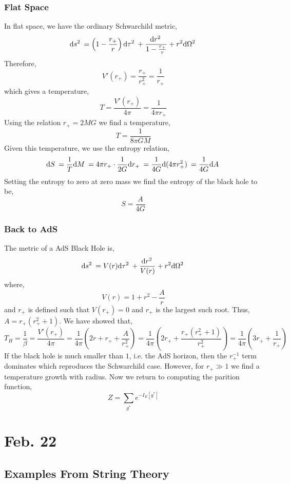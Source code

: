\documentclass[12pt]{extarticle}
\begin{document}
\subsubsection{Flat Space}

In flat space, we have the ordinary Schwarchild metric,
\[ \mathrm{d}s^2 \: = \left( 1 - \frac{r_+}{r} \right) \mathrm{d}\tau^2 \: + \frac{\mathrm{d}r^2 \:}{1 - \frac{r_+}{r}} + r^2 \mathrm{d}\Omega^2 \: \]
Therefore,
\[ V'(r_+) = \frac{r_+}{r_+^2} = \frac{1}{r_+} \]
which gives a temperature,
\[ T = \frac{V'(r_+)}{4 \pi} = \frac{1}{4 \pi r_+} \]
Using the relation $r_+ = 2 M G$ we find a temperature,
\[ T = \frac{1}{8 \pi G M} \]
Given this temperature, we use the entropy relation,
\[ \mathrm{d}S \: = \frac{1}{T} \mathrm{d}M \: = 4 \pi r_+ \cdot \frac{1}{2 G} \mathrm{d}r_+ \: = \frac{1}{4 G} \mathrm{d}(4 \pi r_+^2) \: = \frac{1}{4 G} \mathrm{d}A \: \]
Setting the entropy to zero at zero mass we find the entropy of the black hole to be,
\[ S = \frac{A}{4 G} \]

\subsubsection{Back to AdS}

The metric of a AdS Black Hole is,
\[ \mathrm{d}s^2 \: = V(r) \mathrm{d}\tau^2 \: + \frac{\mathrm{d}r^2 \:}{V(r)} + r^2 \mathrm{d}\Omega^2 \: \]
where,
\[ V(r) = 1 + r^2 - \frac{A}{r} \]
and $r_+$ is defined such that $V(r_+) = 0$ and $r_+$ is the largest such root. Thus, $A = r_+(r_+^2 + 1)$. We have showed that,
\[ T_H = \frac{1}{\beta} = \frac{V'(r_+)}{4 \pi} = \frac{1}{4 \pi} \left( 2 r+ r_+ + \frac{A}{r_+^2} \right) = \frac{1}{4 \pi} \left( 2 r_+ + \frac{r_+(r_+^2 + 1)}{r_+^2} \right) = \frac{1}{4 \pi} \left( 3 r_+ + \frac{1}{r_+} \right) \]
If the black hole is much smaller than $1$, i.e. the AdS horizon, then the $r_+^{-1}$ term dominates which reproduces the Schwarchild case. However, for $r_+ \gg 1$ we find a temperature growth with radius. Now we return to computing the parition function, 
\[ Z = \sum_{g^*} e^{- I_E[g^*]} \]  


\section{Feb. 22}

\subsection{Examples From String Theory}
\end{document}

